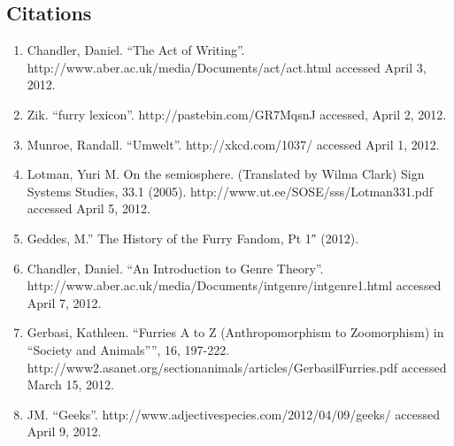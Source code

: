 \subsection*{Citations}
\begin{enumerate}
  \item Chandler, Daniel. ``The Act of Writing''. http://www.aber.ac.uk/media/Documents/act/act.html accessed April 3, 2012.
  \item Zik. ``furry lexicon''. http://pastebin.com/GR7MqsnJ accessed, April 2, 2012.
  \item Munroe, Randall. ``Umwelt''. http://xkcd.com/1037/ accessed April 1, 2012.
  \item Lotman, Yuri M. On the semiosphere. (Translated by Wilma Clark) Sign Systems Studies, 33.1 (2005). http://www.ut.ee/SOSE/sss/Lotman331.pdf accessed April 5, 2012.
  \item Geddes, M.'' The History of the Furry Fandom, Pt 1″ (2012).
  \item Chandler, Daniel. ``An Introduction to Genre Theory''.\\ http://www.aber.ac.uk/media/Documents/intgenre/intgenre1.html accessed April 7, 2012.
  \item Gerbasi, Kathleen. ``Furries A to Z (Anthropomorphism to Zoomorphism) in ``Society and Animals'''', 16, 197-222. http://www2.asanet.org/sectionanimals/articles/GerbasilFurries.pdf accessed March 15, 2012.
  \item JM. ``Geeks''. http://www.adjectivespecies.com/2012/04/09/geeks/ accessed April 9, 2012.
\end{enumerate}
